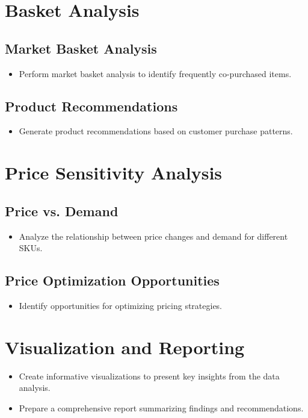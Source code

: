 \documentclass{article}
\begin{document}
\section{Basket Analysis}
    \subsection{Market Basket Analysis}
    \begin{itemize}
        \item Perform market basket analysis to identify frequently co-purchased items.
    \end{itemize}
    
    \subsection{Product Recommendations}
    \begin{itemize}
        \item Generate product recommendations based on customer purchase patterns.
    \end{itemize}

\section{Price Sensitivity Analysis}
    \subsection{Price vs. Demand}
    \begin{itemize}
        \item Analyze the relationship between price changes and demand for different SKUs.
    \end{itemize}
    
    \subsection{Price Optimization Opportunities}
    \begin{itemize}
        \item Identify opportunities for optimizing pricing strategies.
    \end{itemize}

\section{Visualization and Reporting}
    \begin{itemize}
        \item Create informative visualizations to present key insights from the data analysis.
        \item Prepare a comprehensive report summarizing findings and recommendations.
    \end{itemize}
\end{document}
